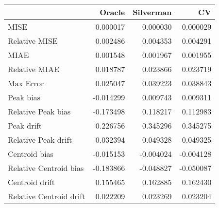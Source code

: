 \begin{tabular}{lrrr}
  \hline
 & Oracle & Silverman & CV \\ 
  \hline
MISE & 0.000017 & 0.000030 & 0.000029 \\ 
  Relative MISE & 0.002486 & 0.004353 & 0.004291 \\ 
  MIAE & 0.001548 & 0.001967 & 0.001955 \\ 
  Relative MIAE & 0.018787 & 0.023866 & 0.023719 \\ 
  Max Error & 0.025047 & 0.039223 & 0.038843 \\ 
  Peak bias & -0.014299 & 0.009743 & 0.009311 \\ 
  Relative Peak bias & -0.173498 & 0.118217 & 0.112983 \\ 
  Peak drift & 0.226756 & 0.345296 & 0.345275 \\ 
  Relative Peak drift & 0.032394 & 0.049328 & 0.049325 \\ 
  Centroid bias & -0.015153 & -0.004024 & -0.004128 \\ 
  Relative Centroid bias & -0.183866 & -0.048827 & -0.050087 \\ 
  Centroid drift & 0.155465 & 0.162885 & 0.162430 \\ 
  Relative Centroid drift & 0.022209 & 0.023269 & 0.023204 \\ 
   \hline
\end{tabular}

